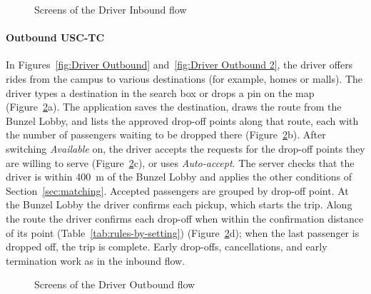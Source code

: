 
    \begin{figure}[htbp]
        \centering
        \hfill
        \hfill
        \hfill
        \caption{Screens of the Driver Inbound flow}
        \label{fig:ui-driver-inbound}
    \end{figure}

\paragraph{Outbound USC-TC} In Figures~\ref{fig:Driver Outbound} and~\ref{fig:Driver Outbound 2}, the driver offers rides from the campus to various destinations (for example, homes or malls). The driver types a destination in the search box or drops a pin on the map (Figure~\ref{fig:ui-driver-outbound}a). The application saves the destination, draws the route from the Bunzel Lobby, and lists the approved drop-off points along that route, each with the number of passengers waiting to be dropped there (Figure~\ref{fig:ui-driver-outbound}b). After switching \emph{Available} on, the driver accepts the requests for the drop-off points they are willing to serve (Figure~\ref{fig:ui-driver-outbound}c), or uses \emph{Auto-accept}. The server checks that the driver is within 400~m of the Bunzel Lobby and applies the other conditions of Section~\ref{sec:matching}. Accepted passengers are grouped by drop-off point. At the Bunzel Lobby the driver confirms each pickup, which starts the trip. Along the route the driver confirms each drop-off when within the confirmation distance of its point (Table~\ref{tab:rules-by-setting}) (Figure~\ref{fig:ui-driver-outbound}d); when the last passenger is dropped off, the trip is complete. Early drop-offs, cancellations, and early termination work as in the inbound flow.



    \begin{figure}[htbp]
        \centering
        \hfill
        \hfill
        \hfill
        \caption{Screens of the Driver Outbound flow}
        \label{fig:ui-driver-outbound}
    \end{figure}

